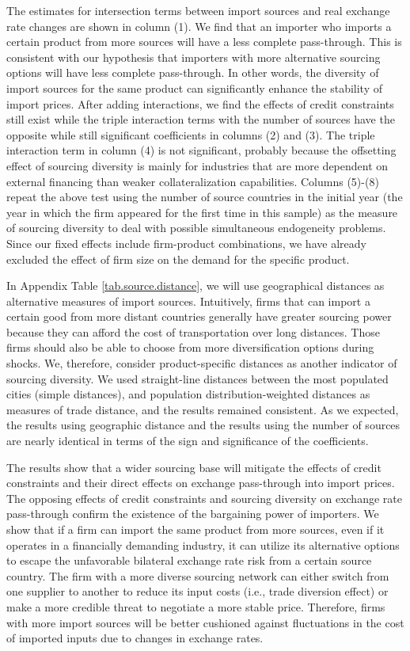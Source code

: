 The estimates for intersection terms between import sources and real exchange rate changes are shown in column (1). We find that an importer who imports a certain product from more sources will have a less complete pass-through. This is consistent with our hypothesis that importers with more alternative sourcing options will have less complete pass-through. In other words, the diversity of import sources for the same product can significantly enhance the stability of import prices. After adding interactions, we find the effects of credit constraints still exist while the triple interaction terms with the number of sources have the opposite while still significant coefficients in columns (2) and (3). The triple interaction term in column (4) is not significant, probably because the offsetting effect of sourcing diversity is mainly for industries that are more dependent on external financing than weaker collateralization capabilities. Columns (5)-(8) repeat the above test using the number of source countries in the initial year (the year in which the firm appeared for the first time in this sample) as the measure of sourcing diversity to deal with possible simultaneous endogeneity problems. Since our fixed effects include firm-product combinations, we have already excluded the effect of firm size on the demand for the specific product.

In Appendix Table \ref{tab.source.distance}, we will use geographical distances as alternative measures of import sources. Intuitively, firms that can import a certain good from more distant countries generally have greater sourcing power because they can afford the cost of transportation over long distances. Those firms should also be able to choose from more diversification options during shocks. We, therefore, consider product-specific distances as another indicator of sourcing diversity. We used straight-line distances between the most populated cities (simple distances), and population distribution-weighted distances as measures of trade distance, and the results remained consistent. As we expected, the results using geographic distance and the results using the number of sources are nearly identical in terms of the sign and significance of the coefficients.

The results show that a wider sourcing base will mitigate the effects of credit constraints and their direct effects on exchange pass-through into import prices. The opposing effects of credit constraints and sourcing diversity on exchange rate pass-through confirm the existence of the bargaining power of importers. We show that if a firm can import the same product from more sources, even if it operates in a financially demanding industry, it can utilize its alternative options to escape the unfavorable bilateral exchange rate risk from a certain source country. The firm with a more diverse sourcing network can either switch from one supplier to another to reduce its input costs (i.e., trade diversion effect) or make a more credible threat to negotiate a more stable price. Therefore, firms with more import sources will be better cushioned against fluctuations in the cost of imported inputs due to changes in exchange rates.

